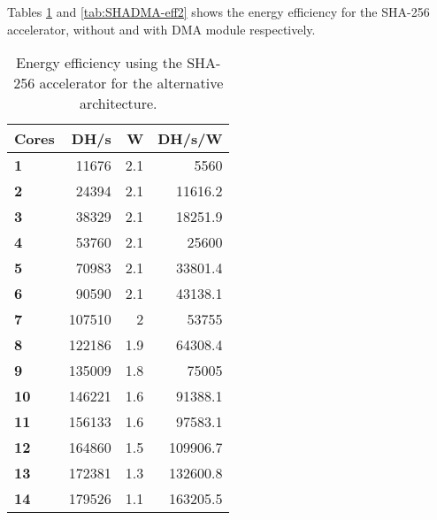 \begin{appendix}
Tables \ref{tab:SHA-eff2} and \ref{tab:SHADMA-eff2} shows the energy efficiency for the SHA-256 accelerator, without and with DMA module respectively.

\begin{table}
\centering
\begin{tabular}{| l | r | r || r |}
  \hline 
  \textbf{Cores} & \textbf{DH/s} & \textbf{W} & \textbf{DH/s/W} \\
  \hline                       
  \textbf{1} & 11676 & 2.1 & 5560\\
  \textbf{2} & 24394 & 2.1 & 11616.2\\
  \textbf{3} & 38329 & 2.1 & 18251.9\\
  \textbf{4} & 53760 & 2.1 & 25600\\
  \textbf{5} & 70983 & 2.1 & 33801.4\\
  \textbf{6} & 90590 & 2.1 & 43138.1\\
  \textbf{7} & 107510 & 2 & 53755\\
  \textbf{8} & 122186 & 1.9 & 64308.4\\
  \textbf{9} & 135009 & 1.8 & 75005\\
  \textbf{10} & 146221 & 1.6 & 91388.1\\
  \textbf{11} & 156133 & 1.6 & 97583.1\\
  \textbf{12} & 164860 & 1.5 & 109906.7\\
  \textbf{13} & 172381 & 1.3 & 132600.8\\
  \textbf{14} & 179526 & 1.1 & 163205.5\\
  \hline 
\end{tabular}
\caption{Energy efficiency using the SHA-256 accelerator for the alternative architecture.}
\label{tab:SHA-eff2}
\end{table}


\end{appendix}
